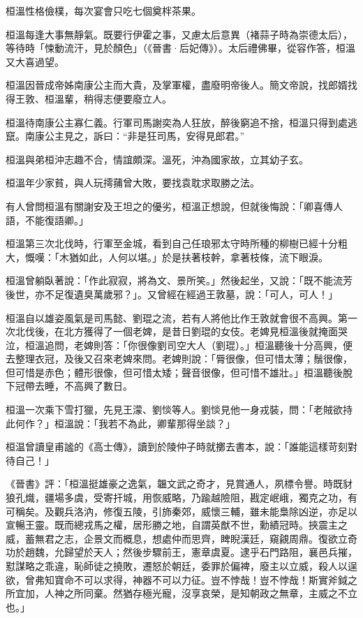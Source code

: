 桓溫性格儉樸，每次宴會只吃七個奠柈茶果。

桓溫每逢大事無靜氣。既要行伊霍之事，又慮太后意異（褚蒜子時為崇德太后），等待時「悚動流汗，見於顏色」（《晉書·后妃傳》）。太后禮佛畢，從容作答，桓溫又大喜過望。

桓溫因晉成帝姊南康公主而大貴，及掌軍權，盡廢明帝後人。簡文帝說，找郎婿找得王敦、桓溫輩，稍得志便要廢立人。

桓溫待南康公主寡仁義。行軍司馬謝奕為人狂放，醉後窮追不捨，桓溫只得到處逃竄。南康公主見之，訴曰：“非是狂司馬，安得見郎君。”

桓溫與弟桓沖志趣不合，情誼頗深。溫死，沖為國家故，立其幼子玄。

桓溫年少家貧，與人玩摴蒱曾大敗，要找袁耽求取勝之法。

有人曾問桓溫有關謝安及王坦之的優劣，桓溫正想說，但就後悔說：「卿喜傳人語，不能復語卿。」

桓溫第三次北伐時，行軍至金城，看到自己任琅邪太守時所種的柳樹已經十分粗大，慨嘆：「木猶如此，人何以堪。」於是扶著枝幹，拿著枝條，流下眼淚。

桓溫曾躺臥著說：「作此寂寂，將為文、景所笑。」然後起坐，又說：「既不能流芳後世，亦不足復遺臭萬歲邪？」。又曾經在經過王敦墓，說：「可人，可人！」

桓溫自以雄姿風氣是司馬懿、劉琨之流，若有人將他比作王敦就會很不高興。第一次北伐後，在北方獲得了一個老婢，是昔日劉琨的女伎。老婢見桓溫後就掩面哭泣，桓溫追問，老婢則答：「你很像劉司空大人（劉琨）。」桓溫聽後十分高興，便去整理衣冠，及後又召來老婢來問。老婢則說：「脣很像，但可惜太薄；鬚很像，但可惜是赤色；體形很像，但可惜太矮；聲音很像，但可惜不雄壯。」桓溫聽後脫下冠帶去睡，不高興了數日。

桓溫一次乘下雪打獵，先見王濛、劉惔等人。劉惔見他一身戎裝，問：「老賊欲持此何作？」桓溫說：「我若不為此，卿輩那得坐談？」

桓温曾讀皇甫謐的《高士傳》，讀到於陵仲子時就擲去書本，說：「誰能這樣苛刻對待自己！」

《晉書》評：「桓溫挺雄豪之逸氣，韞文武之奇才，見賞通人，夙標令譽。時既豺狼孔熾，疆場多虞，受寄扞城，用恢威略，乃踰越險阻，戡定岷峨，獨克之功，有可稱矣。及觀兵洛汭，修復五陵，引斾秦郊，威懷三輔，雖未能梟除凶逆，亦足以宣暢王靈。既而總戎馬之權，居形勝之地，自謂英猷不世，勳績冠時。挾震主之威，蓄無君之志，企景文而概息，想處仲而思齊，睥睨漢廷，窺覦周鼎。復欲立奇功於趙魏，允歸望於天人；然後步驟前王，憲章虞夏。逮乎石門路阻，襄邑兵摧，懟謀略之乖違，恥師徒之撓敗，遷怒於朝廷，委罪於偏裨，廢主以立威，殺人以逞欲，曾弗知寶命不可以求得，神器不可以力征。豈不悖哉！豈不悖哉！斯實斧鉞之所宜加，人神之所同棄。然猶存極光寵，沒享哀榮，是知朝政之無章，主威之不立也。」

